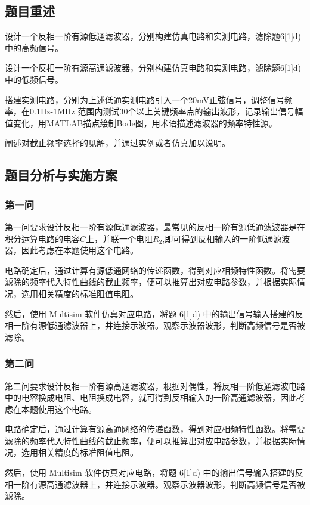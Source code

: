 \documentclass[./测控三级项目.tex]{subfiles} %
\begin{document}
	\subsection{题目重述}
		\begin{compactenum}
			\item 设计一个反相一阶有源低通滤波器，分别构建仿真电路和实测电路，滤除题6[1]d)中的高频信号。
			\item 设计一个反相一阶有源高通滤波器，分别构建仿真电路和实测电路，滤除题6[1]d)中的低频信号。
			\item 搭建实测电路，分别为上述低通实测电路引入一个20mV正弦信号，调整信号频率，在0.1Hz-1MHz 范围内测试30个以上关键频率点的输出波形，记录输出信号幅值变化，用MATLAB描点绘制Bode图，用术语描述滤波器的频率特性源。
			\item 阐述对截止频率选择的见解，并通过实例或者仿真加以说明。
		\end{compactenum}
	\subsection{题目分析与实施方案}
		\subsubsection{第一问}
			第一问要求设计反相一阶有源低通滤波器，最常见的反相一阶有源低通滤波器是在积分运算电路的电容$C$上，并联一个电阻$R_2$,即可得到反相输入的一阶低通滤波器，因此考虑在本题使用这个电路。\par 
			电路确定后，通过计算有源低通网络的传递函数，得到对应相频特性函数。将需要滤除的频率代入特性曲线的截止频率，便可以推算出对应电路参数，并根据实际情况，选用相关精度的标准阻值电阻。\par 
			然后，使用 Multisim 软件仿真对应电路，将题 6[1]d) 中的输出信号输入搭建的反相一阶有源低通滤波器上，并连接示波器。观察示波器波形，判断高频信号是否被滤除。\par
		\subsubsection{第二问}
			第二问要求设计反相一阶有源高通滤波器，根据对偶性，将反相一阶低通滤波电路中的电容换成电阻、电阻换成电容，就可得到反相输入的一阶高通滤波器，因此考虑在本题使用这个电路。 \par
			电路确定后，通过计算有源高通网络的传递函数，得到对应相频特性函数。将需要滤除的频率代入特性曲线的截止频率，便可以推算出对应电路参数，并根据实际情况，选用相关精度的标准阻值电阻。 \par
			然后，使用 Multisim 软件仿真对应电路，将题 6[1]d) 中的输出信号输入搭建的反相一阶有源高通滤波器上，并连接示波器。观察示波器波形，判断高频信号是否被滤除。\par
\end{document}
